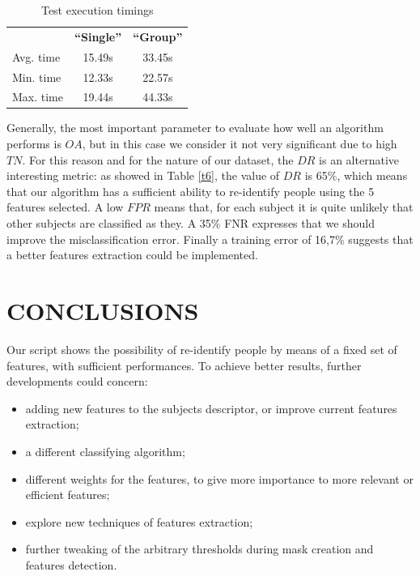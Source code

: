 \documentclass[letterpaper, 11pt, conference]{ieeeconf} %
\begin{document}
\begin{table}[t]
\centering
\begin{tabular}{lcc}
	& \textbf{``Single''} & \textbf{``Group''}\\
	Avg. time & 15.49s & 33.45s\\
	Min. time & 12.33s & 22.57s\\
	Max. time & 19.44s & 44.33s\\
\end{tabular}
\caption{Test execution timings} \label{t7}
\vspace{-1.5em}
\end{table}

Generally, the most important parameter to evaluate how well an algorithm performs is $OA$, but in this case we consider it not very significant due to high $TN$. For this reason and for the nature of our dataset, the $DR$ is an alternative interesting metric: as showed in Table \ref{t6}, the value of $DR$ is 65\%, which means that our algorithm has a sufficient ability to re-identify people using the 5 features selected. A low $FPR$ means that, for each subject it is quite unlikely that other subjects are classified as they. A 35\% FNR expresses that we should improve the misclassification error. 
Finally a training error of 16,7\% suggests that a better features extraction could be implemented.

\section{CONCLUSIONS} \label{s5}
Our script shows the possibility of re-identify people by means of a fixed set of features, with sufficient performances. To achieve better results, further developments could concern:

\begin{itemize}
\item{adding new features to the subjects descriptor, or improve current features extraction;}
\item{a different classifying algorithm;}
\item{different weights for the features, to give more importance to more relevant or efficient features;}
\item{explore new techniques of features extraction;}
\item{further tweaking of the arbitrary thresholds during mask creation and features detection.}
\end{itemize}
\end{document}
